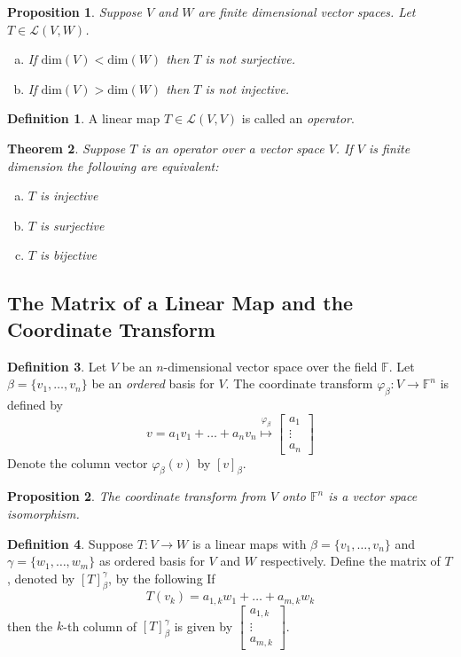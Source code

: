 \documentclass[12pt,letterpaper]{amsart}
\theoremstyle{plain}
\newtheorem{theorem}{Theorem}[section]
\newtheorem{proposition}{Proposition}[section]
\theoremstyle{definition}
\newtheorem{definition}[theorem]{Definition}
\numberwithin{equation}{section}
\begin{document}
\begin{proposition} Suppose $V$ and $W$ are finite dimensional vector spaces. Let $T\in \mathcal{L}(V,W)$. 
\begin{enumerate}[a)]
\item If $\text{dim}(V)<\text{dim}(W)$ then $T$ is not surjective.
\item If $\text{dim}(V)>\text{dim}(W)$ then $T$ is not injective.
\end{enumerate}
\end{proposition}

\begin{definition} A linear map $T\in \mathcal{L}(V,V)$ is called an \emph{operator}. 
\end{definition}
\begin{theorem} Suppose $T$ is an operator over a vector space $V$. If $V$ is finite dimension the following are equivalent:
\begin{enumerate}[a)]
\item $T$ is injective
\item $T$ is surjective
\item $T$ is bijective
\end{enumerate}
\end{theorem}
\newpage
\subsection{The Matrix of a Linear Map and the Coordinate Transform}
\begin{definition} Let $V$ be an $n$-dimensional vector space over the field $\mathbb{F}$. Let $\beta=\{v_1, \ldots, v_n\}$ be an \emph{ordered} basis for $V$. The coordinate transform $\varphi_\beta:V\rightarrow \mathbb{F}^n$ is defined by 
\[v=a_1v_1+\ldots+a_nv_n\overset{\varphi_\beta}{\longmapsto} \begin{bmatrix}a_1\\ \vdots \\ a_n\end{bmatrix}\]
Denote the column vector $\varphi_\beta(v)$ by $[v]_\beta$.
\end{definition}
\begin{proposition} The coordinate transform from $V$ onto $\mathbb{F}^n$ is a vector space isomorphism.
\end{proposition}

\begin{definition} Suppose $T:V\rightarrow W$ is a linear maps with $\beta=\{v_1,\ldots, v_n\}$ and $\gamma=\{w_1, \ldots, w_m\}$ as ordered basis for $V$ and $W$ respectively. Define the matrix of $T$, denoted by $[T]_\beta^\gamma$, by the following
If 
\[T(v_k)=a_{1,k}w_1+\ldots +a_{m,k}w_k\]
then the $k$-th column of $[T]_\beta^\gamma$ is given by $\begin{bmatrix} a_{1,k}\\ \vdots \\ a_{m,k}\end{bmatrix}$. 
\end{definition}
\end{document}
